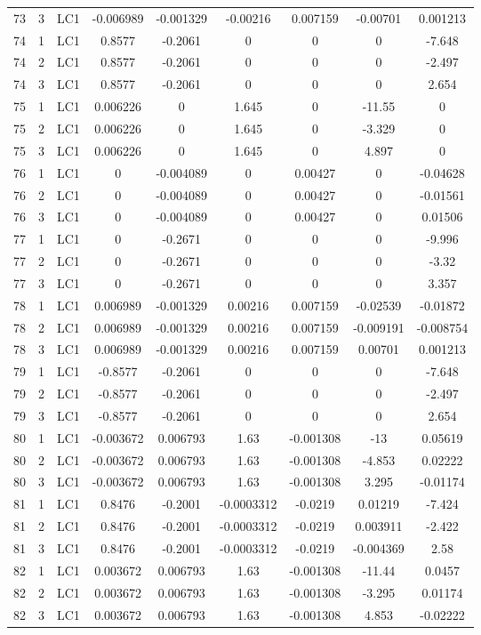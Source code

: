 \documentclass{article}%
\begin{document}
\begin{longtable}{| c c c | c c c c c c |}
73&3&LC1&{-}0.006989&{-}0.001329&{-}0.00216&0.007159&{-}0.00701&0.001213\\%
74&1&LC1&0.8577&{-}0.2061&0&0&0&{-}7.648\\%
74&2&LC1&0.8577&{-}0.2061&0&0&0&{-}2.497\\%
74&3&LC1&0.8577&{-}0.2061&0&0&0&2.654\\%
75&1&LC1&0.006226&0&1.645&0&{-}11.55&0\\%
75&2&LC1&0.006226&0&1.645&0&{-}3.329&0\\%
75&3&LC1&0.006226&0&1.645&0&4.897&0\\%
76&1&LC1&0&{-}0.004089&0&0.00427&0&{-}0.04628\\%
76&2&LC1&0&{-}0.004089&0&0.00427&0&{-}0.01561\\%
76&3&LC1&0&{-}0.004089&0&0.00427&0&0.01506\\%
77&1&LC1&0&{-}0.2671&0&0&0&{-}9.996\\%
77&2&LC1&0&{-}0.2671&0&0&0&{-}3.32\\%
77&3&LC1&0&{-}0.2671&0&0&0&3.357\\%
78&1&LC1&0.006989&{-}0.001329&0.00216&0.007159&{-}0.02539&{-}0.01872\\%
78&2&LC1&0.006989&{-}0.001329&0.00216&0.007159&{-}0.009191&{-}0.008754\\%
78&3&LC1&0.006989&{-}0.001329&0.00216&0.007159&0.00701&0.001213\\%
79&1&LC1&{-}0.8577&{-}0.2061&0&0&0&{-}7.648\\%
79&2&LC1&{-}0.8577&{-}0.2061&0&0&0&{-}2.497\\%
79&3&LC1&{-}0.8577&{-}0.2061&0&0&0&2.654\\%
80&1&LC1&{-}0.003672&0.006793&1.63&{-}0.001308&{-}13&0.05619\\%
80&2&LC1&{-}0.003672&0.006793&1.63&{-}0.001308&{-}4.853&0.02222\\%
80&3&LC1&{-}0.003672&0.006793&1.63&{-}0.001308&3.295&{-}0.01174\\%
81&1&LC1&0.8476&{-}0.2001&{-}0.0003312&{-}0.0219&0.01219&{-}7.424\\%
81&2&LC1&0.8476&{-}0.2001&{-}0.0003312&{-}0.0219&0.003911&{-}2.422\\%
81&3&LC1&0.8476&{-}0.2001&{-}0.0003312&{-}0.0219&{-}0.004369&2.58\\%
82&1&LC1&0.003672&0.006793&1.63&{-}0.001308&{-}11.44&0.0457\\%
82&2&LC1&0.003672&0.006793&1.63&{-}0.001308&{-}3.295&0.01174\\%
82&3&LC1&0.003672&0.006793&1.63&{-}0.001308&4.853&{-}0.02222\\%

\end{longtable}
\end{document}
